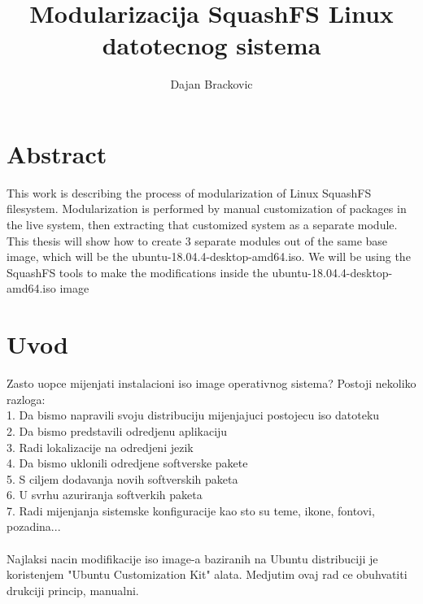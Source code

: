 \documentclass[12pt,vi]{mitthesis}
\begin{document}
\author{Dajan Brackovic}
\title{Modularizacija SquashFS Linux datotecnog sistema}

\maketitle
\tableofcontents

\chapter*{Abstract}
This work is describing the process of modularization of Linux SquashFS filesystem. Modularization is performed by manual customization of packages in the live system, then extracting that customized system as a separate module. 
\noindent
This thesis will show how to create 3 separate modules out of the same base image, which will be the ubuntu-18.04.4-desktop-amd64.iso.
\noindent
We will be using the SquashFS tools to make the modifications inside the ubuntu-18.04.4-desktop-amd64.iso image

\chapter*{Uvod}
Zasto uopce mijenjati instalacioni iso image operativnog sistema? Postoji nekoliko razloga:\\
1. Da bismo napravili svoju distribuciju mijenjajuci postojecu iso datoteku\\
2. Da bismo predstavili odredjenu aplikaciju\\
3. Radi lokalizacije na odredjeni jezik\\
4. Da bismo uklonili odredjene softverske pakete\\
5. S ciljem dodavanja novih softverskih paketa\\
6. U svrhu azuriranja softverkih paketa\\
7. Radi mijenjanja sistemske konfiguracije kao sto su teme, ikone, fontovi, pozadina...\\
\\
Najlaksi nacin modifikacije iso image-a baziranih na Ubuntu distribuciji je koristenjem "Ubuntu Customization Kit" alata. Medjutim ovaj rad ce obuhvatiti drukciji princip, manualni.\\
\end{document}
